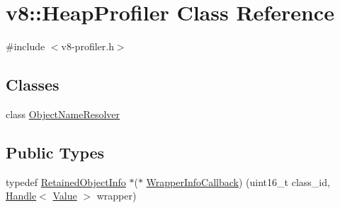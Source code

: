 \hypertarget{classv8_1_1_heap_profiler}{}\section{v8\+:\+:Heap\+Profiler Class Reference}
\label{classv8_1_1_heap_profiler}


{\ttfamily \#include $<$v8-\/profiler.\+h$>$}

\subsection*{Classes}
\begin{DoxyCompactItemize}
\item 
class \hyperlink{classv8_1_1_heap_profiler_1_1_object_name_resolver}{Object\+Name\+Resolver}
\end{DoxyCompactItemize}
\subsection*{Public Types}
\begin{DoxyCompactItemize}
\item 
typedef \hyperlink{classv8_1_1_retained_object_info}{Retained\+Object\+Info} $\ast$($\ast$ \hyperlink{classv8_1_1_heap_profiler_a696d8d6590879eeb5a4ad2814eafb599}{Wrapper\+Info\+Callback}) (uint16\+\_\+t class\+\_\+id, \hyperlink{classv8_1_1_handle}{Handle}$<$ \hyperlink{classv8_1_1_value}{Value} $>$ wrapper)
\end{DoxyCompactItemize}
